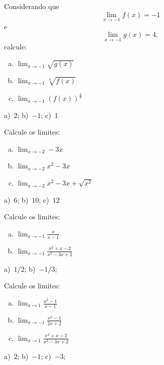 \begin{exer}
  Considerando que
  \begin{equation}
    \lim_{x\to -1} f(x) = -1
  \end{equation}
  e
  \begin{equation}
    \lim_{x\to -1} g(x) = 4,
  \end{equation}
  calcule:
  \begin{enumerate}[a)]
  \item $\displaystyle\lim_{x\to -1} \sqrt{g(x)}$
  \item $\displaystyle\lim_{x\to -1} \sqrt[3]{f(x)}$
  \item $\displaystyle\lim_{x\to -1} (f(x))^{\frac{4}{3}}$
  \end{enumerate}
\end{exer}
\begin{resp}
  a)~$2$; b)~$-1$; c)~$1$
\end{resp}

\begin{exer}
  Calcule os limites:
  \begin{enumerate}[a)]
  \item $\displaystyle\lim_{x\to -2} -3x$
  \item $\displaystyle\lim_{x\to -2} x^2-3x$
  \item $\displaystyle\lim_{x\to -2} x^2-3x+\sqrt{x^2}$
  \end{enumerate}
\end{exer}
\begin{resp}
  a)~$6$; b)~$10$; c)~$12$
\end{resp}

\begin{exer}
  Calcule os limites:
  \begin{enumerate}[a)]
  \item $\displaystyle\lim_{x\to -1} \frac{x}{x-1}$
  \item $\displaystyle\lim_{x\to -1} \frac{x^2+x-2}{x^2-3x+2}$
  \end{enumerate}
\end{exer}
\begin{resp}
  a)~$1/2$; b)~$-1/3$;
\end{resp}

\begin{exer}
  Calcule os limites:
  \begin{enumerate}[a)]
  \item $\displaystyle\lim_{x\to 1} \frac{x^2-1}{x-1}$
  \item $\displaystyle\lim_{x\to -1} \frac{x^2-1}{2x+2}$
  \item $\displaystyle\lim_{x\to 1} \frac{x^2+x-2}{x^2-3x+2}$
  \end{enumerate}
\end{exer}
\begin{resp}
  a)~$2$; b)~$-1$; c)~$-3$;
\end{resp}

